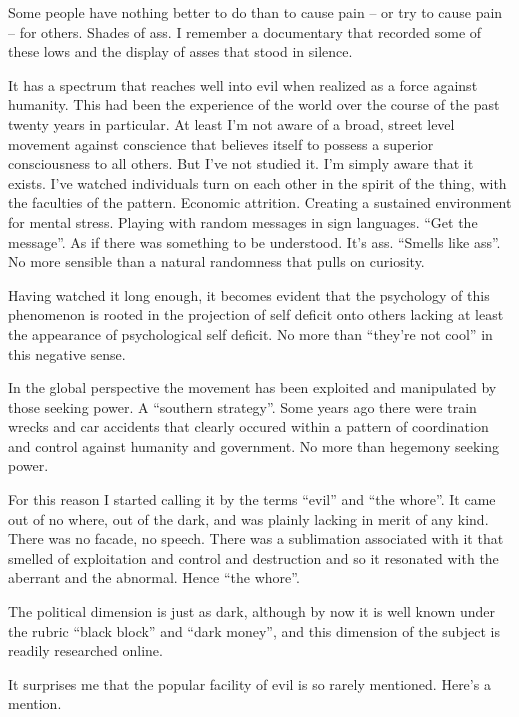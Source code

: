 

Some people have nothing better to do than to cause pain -- or try to
cause pain -- for others.  Shades of ass.  I remember a documentary
that recorded some of these lows and the display of asses that stood
in silence.   

It has a spectrum that reaches well into evil when realized as a force
against humanity.  This had been the experience of the world over the
course of the past twenty years in particular.  At least I'm not aware
of a broad, street level movement against conscience that believes
itself to possess a superior consciousness to all others.  But I've
not studied it.  I'm simply aware that it exists.  I've watched
individuals turn on each other in the spirit of the thing, with the
faculties of the pattern.  Economic attrition.  Creating a sustained
environment for mental stress.  Playing with random messages in sign
languages.  ``Get the message''.  As if there was something to be
understood.  It's ass.  ``Smells like ass''.  No more sensible than a
natural randomness that pulls on curiosity.

Having watched it long enough, it becomes evident that the psychology
of this phenomenon is rooted in the projection of self deficit onto
others lacking at least the appearance of psychological self deficit.
No more than ``they're not cool'' in this negative sense.

In the global perspective the movement has been exploited and
manipulated by those seeking power.  A ``southern strategy''.  Some
years ago there were train wrecks and car accidents that clearly
occured within a pattern of coordination and control against humanity
and government.  No more than hegemony seeking power.

For this reason I started calling it by the terms ``evil'' and ``the
whore''.  It came out of no where, out of the dark, and was plainly
lacking in merit of any kind.  There was no facade, no speech.  There
was a sublimation associated with it that smelled of exploitation and
control and destruction and so it resonated with the aberrant and the
abnormal.  Hence ``the whore''.

The political dimension is just as dark, although by now it is well
known under the rubric ``black block'' and ``dark money'', and this
dimension of the subject is readily researched online.  

It surprises me that the popular facility of evil is so rarely
mentioned.  Here's a mention.

\bye
